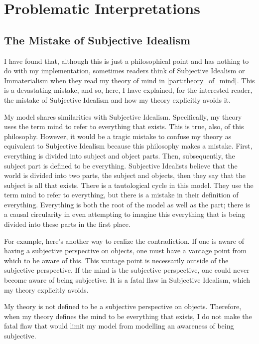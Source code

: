 \chapter{Problematic Interpretations}
\label{chapter:problematic_interpretations}

\section{The Mistake of Subjective Idealism}
\label{section:the_mistake_of_subjective_idealism}

I have found that, although this is just a philosophical point and has
nothing to do with my implementation, sometimes readers think of
Subjective Idealism or Immaterialism \citep{berkeley:1734} when they
read my theory of mind in \autoref{part:theory_of_mind}.  This is a
devastating mistake, and so, here, I have explained, for the
interested reader, the mistake of Subjective Idealism and how my
theory explicitly avoids it.

My model shares similarities with Subjective Idealism.  Specifically,
my theory uses the term mind to refer to everything that exists.  This
is true, also, of this philosophy.  However, it would be a tragic
mistake to confuse my theory as equivalent to Subjective Idealism
because this philosophy makes a mistake.  First, everything is divided
into subject and object parts.  Then, subsequently, the subject part
is defined to be everything.  Subjective Idealists believe that the
world is divided into two parts, the subject and objects, then they
say that the subject is all that exists.  There is a tautological
cycle in this model.  They use the term mind to refer to everything,
but there is a mistake in their definition of everything.  Everything
is both the root of the model as well as the part; there is a causal
circularity in even attempting to imagine this everything that is
being divided into these parts in the first place.

For example, here's another way to realize the contradiction.  If one
is aware of having a subjective perspective on objects, one must have
a vantage point from which to be aware of this.  This vantage point is
necessarily outside of the subjective perspective.  If the mind is the
subjective perspective, one could never become aware of being
subjective.  It is a fatal flaw in Subjective Idealism, which my
theory explicitly avoids.

My theory is not defined to be a subjective perspective on objects.
Therefore, when my theory defines the mind to be everything that
exists, I do not make the fatal flaw that would limit my model from
modelling an awareness of being subjective.

